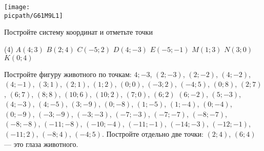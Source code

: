 \begin{class}[number=1]
\begin{listofex}
\begin{minipage}[c]{0.6\linewidth}
		\end{minipage}
		\begin{minipage}[c]{0.4\linewidth}
			\texttt{[image: \\picpath/G61M9L1]}
		\end{minipage}
		\item Постройте систему координат и отметьте точки
		\begin{tasks}(4)
			\task \( A(4;3) \)
			\task \( B(2;4) \)
			\task \( C(-5;2) \)
			\task \( D(4;-3) \)
			\task \( E(-5;-1) \)
			\task \( M(1;3) \)
			\task \( N(3;0) \)
			\task \( K(0;4) \)
		\end{tasks}
		\item Постройте фигуру животного по точкам: \( 4;-3 \), \( (2;-3) \), \( (2;-2) \), \( (4;-2) \), \( (4;-1) \), \( (3;1) \), \( (2;1) \), \( (1;2) \), \( (0;0) \), \( (-3;2) \), \( (-4;5) \), \( (0;8) \), \( (2;7) \), \( (6;7) \), \( (8;8) \), \( (10;6) \), \( (10;2) \), \( (7;0) \), \( (6;2) \) \( (6;-2) \), \( (5;-3) \), \( (4;-3) \), \( (4;-5) \), \( (3;-9) \), \( (0;-8) \), \( (1;-5) \), \( (1;-4) \), \( (0;-4) \), \( (0;-9) \), \( (-3;-9) \), \( (-3;-3) \), \( (-7;-3) \), \( (-7;-7) \),  \( (-8;-7) \), \( (-8;-8) \), \( (-11;-8) \), \( (-10;-4) \), \( (-11;-1) \), \( (-14;-3) \), \( (-12;-1) \), \( (-11;2) \), \( (-8;4) \), \( (-4;5) \). Постройте отдельно две точки: \( (2;4) \), \( (6;4) \) --- это глаза животного.
	\end{listofex}
\end{class}
